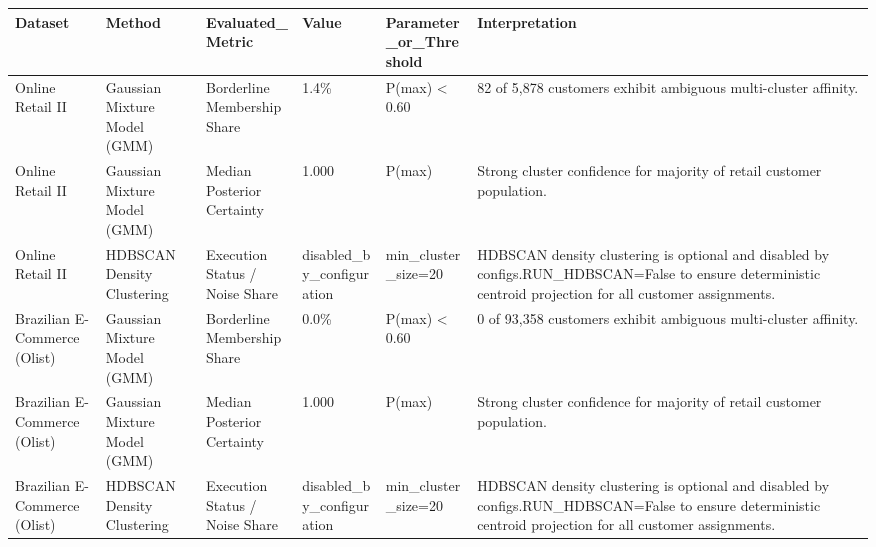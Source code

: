 \begin{tabular}{llllll}
\toprule
Dataset & Method & Evaluated\_Metric & Value & Parameter\_or\_Threshold & Interpretation \\
\midrule
Online Retail II & Gaussian Mixture Model (GMM) & Borderline Membership Share & 1.4\% & P(max) < 0.60 & 82 of 5,878 customers exhibit ambiguous multi-cluster affinity. \\
Online Retail II & Gaussian Mixture Model (GMM) & Median Posterior Certainty & 1.000 & P(max) & Strong cluster confidence for majority of retail customer population. \\
Online Retail II & HDBSCAN Density Clustering & Execution Status / Noise Share & disabled\_by\_configuration & min\_cluster\_size=20 & HDBSCAN density clustering is optional and disabled by configs.RUN\_HDBSCAN=False to ensure deterministic centroid projection for all customer assignments. \\
Brazilian E-Commerce (Olist) & Gaussian Mixture Model (GMM) & Borderline Membership Share & 0.0\% & P(max) < 0.60 & 0 of 93,358 customers exhibit ambiguous multi-cluster affinity. \\
Brazilian E-Commerce (Olist) & Gaussian Mixture Model (GMM) & Median Posterior Certainty & 1.000 & P(max) & Strong cluster confidence for majority of retail customer population. \\
Brazilian E-Commerce (Olist) & HDBSCAN Density Clustering & Execution Status / Noise Share & disabled\_by\_configuration & min\_cluster\_size=20 & HDBSCAN density clustering is optional and disabled by configs.RUN\_HDBSCAN=False to ensure deterministic centroid projection for all customer assignments. \\
\bottomrule
\end{tabular}

